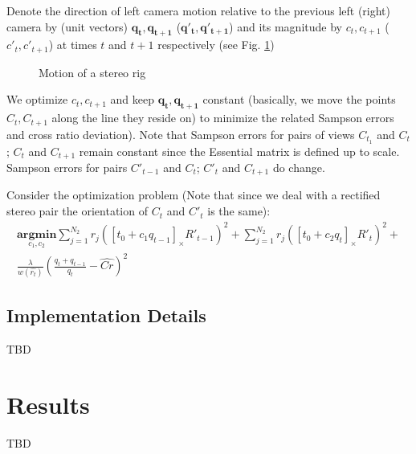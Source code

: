 \documentclass[10pt]{article}         %
\begin{document}
Denote the direction of left camera motion relative to the previous
left (right) camera by (unit vectors) $\mathbf{q_t},\mathbf{q_{t+1}}$
($\mathbf{q'_t},\mathbf{q'_{t+1}}$) and its magnitude by $c_t,c_{t+1}$
($c'_t,c'_{t+1}$) at times $t$ and $t+1$ respectively (see
Fig. \ref{fig:cross_ratio_refine})

\begin{figure}[!h]
  \centering
  \caption{Motion of a stereo rig}
  \label{fig:cross_ratio_refine}
\end{figure}

We optimize $c_t,c_{t+1}$ and keep $\mathbf{q_t},\mathbf{q_{t+1}}$
constant (basically, we move the points $C_t, C_{t+1}$ along the line
they reside on) to minimize the related Sampson errors and cross ratio
deviation). Note that Sampson errors for pairs of views $C_{t_1}$ and
$C_t$; $C_t$ and $C_{t+1}$ remain constant since the Essential matrix
is defined up to scale.  Sampson errors for pairs $C'_{t-1}$ and
$C_t$; $C'_t$ and $C_{t+1}$ do change. 

Consider the optimization problem (Note that since we deal with a
rectified stereo pair the orientation of $C_t$ and $C'_t$ is the same):
\begin{multline}
  \underset{c_1,c_2}{\mathbf{argmin}} \sum_{j=1}^{N_2}{
    r_j([t_0+c_1q_{t-1}]_\times R'_{t-1})^2 } + \sum_{j=1}^{N_2}{
    r_j([t_0+c_2q_{t}]_\times R'_{t})^2 } +\\
  \frac{\lambda}{w(\hat{r_t})}(\frac{q_t+q_{t-1}}{q_t} - \hat{Cr})^2
\end{multline}


\subsection{Implementation Details}
TBD

\section{Results}
TBD



\end{document}
